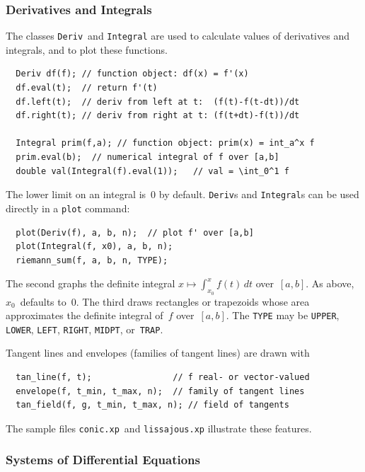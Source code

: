 \documentclass[12pt,letterpaper]{book}
\newcommand{\code}[1]{\texttt{#1}}
\newcommand{\filename}[1]{\texttt{#1}}
\newcommand{\teximath}[1]{$#1$}
\newcommand{\findex}[1]{\ignorespaces}
\begin{document}
\subsubsection*{Derivatives and Integrals}

The classes \code{Deriv}~and \code{Integral} are used to calculate
values of derivatives and integrals, and to plot these functions.
\findex{Deriv}
\findex{Deriv.eval}
\findex{Deriv.left}
\findex{Deriv.right}
\findex{Integral}
\findex{Integral.eval}
\begin{verbatim}
  Deriv df(f); // function object: df(x) = f'(x)
  df.eval(t);  // return f'(t)
  df.left(t);  // deriv from left at t:  (f(t)-f(t-dt))/dt
  df.right(t); // deriv from right at t: (f(t+dt)-f(t))/dt

  Integral prim(f,a); // function object: prim(x) = int_a^x f
  prim.eval(b);  // numerical integral of f over [a,b]
  double val(Integral(f).eval(1));   // val = \int_0^1 f
\end{verbatim}
The lower limit on an integral is~0 by default. \code{Deriv}s and
\code{Integral}s can be used directly in a \code{plot} command:
\findex{plot}
\findex{riemann\_sum}
\begin{verbatim}
  plot(Deriv(f), a, b, n);  // plot f' over [a,b]
  plot(Integral(f, x0), a, b, n);
  riemann_sum(f, a, b, n, TYPE);
\end{verbatim}
The second graphs the definite integral \teximath{x\mapsto\int_{x_0}^x
f(t)\,dt} over~\teximath{[a,b]}. As above, \teximath{x_0}~defaults
to~0. The third draws rectangles or trapezoids whose area approximates
the definite integral of~\teximath{f} over~\teximath{[a,b]}. The
\code{TYPE} may be \code{UPPER}, \code{LOWER}, \code{LEFT},
\code{RIGHT}, \code{MIDPT}, or~\code{TRAP}.

Tangent lines and envelopes (families of tangent lines) are drawn with
\findex{tan\_line}
\findex{envelope}
\findex{tan\_field}
\begin{verbatim}
  tan_line(f, t);                // f real- or vector-valued
  envelope(f, t_min, t_max, n);  // family of tangent lines
  tan_field(f, g, t_min, t_max, n); // field of tangents
\end{verbatim}
The sample files \filename{conic.xp}~and \filename{lissajous.xp}
illustrate these features.


\subsubsection*{Systems of Differential Equations}
\end{document}
